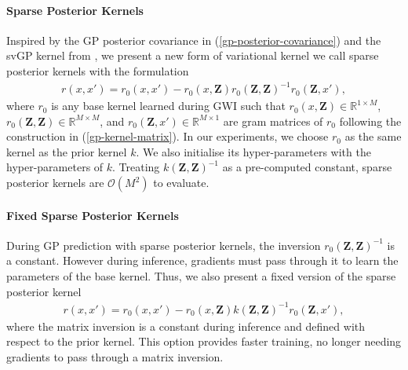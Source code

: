\documentclass{article}
\numberwithin{equation}{section}
\begin{document}
\paragraph{Sparse Posterior Kernels}
Inspired by the GP posterior covariance in (\ref{gp-posterior-covariance}) and the svGP kernel from \cite{titsias2009variational}, we present a new form of variational kernel we call sparse posterior kernels with the formulation
\begin{align}
    r(x, x') = r_0(x, x') - r_0\left(x, \mathbf{Z}\right) r_0\left(\mathbf{Z}, \mathbf{Z}\right)^{-1} r_0\left(\mathbf{Z}, x'\right),
\end{align}
where $r_0$ is any base kernel learned during GWI such that $r_0\left(x, \mathbf{Z}\right) \in \mathbb{R}^{1 \times M}$, $r_0\left(\mathbf{Z}, \mathbf{Z}\right) \in \mathbb{R}^{M \times M}$, and $r_0\left(\mathbf{Z}, x'\right) \in \mathbb{R}^{M \times 1}$ are gram matrices of $r_0$ following the construction in (\ref{gp-kernel-matrix}).
In our experiments, we choose $r_0$ as the same kernel as the prior kernel $k$. We also initialise its hyper-parameters with the hyper-parameters of $k$.
Treating $k\left(\mathbf{Z}, \mathbf{Z}\right)^{-1}$ as a pre-computed constant, sparse posterior kernels are $\mathcal{O}(M^2)$ to evaluate.

\paragraph{Fixed Sparse Posterior Kernels}
During GP prediction with sparse posterior kernels, the inversion $r_0\left(\mathbf{Z}, \mathbf{Z}\right)^{-1}$ is a constant. However during inference, gradients must pass through it to learn the parameters of the base kernel. Thus, we also present a fixed version of the sparse posterior kernel
\begin{align}
    r(x, x') = r_0(x, x') - r_0\left(x, \mathbf{Z}\right) k\left(\mathbf{Z}, \mathbf{Z}\right)^{-1} r_0\left(\mathbf{Z}, x'\right),
\end{align}
where the matrix inversion is a constant during inference and defined with respect to the prior kernel. This option provides faster training, no longer needing gradients to pass through a matrix inversion.
\end{document}

